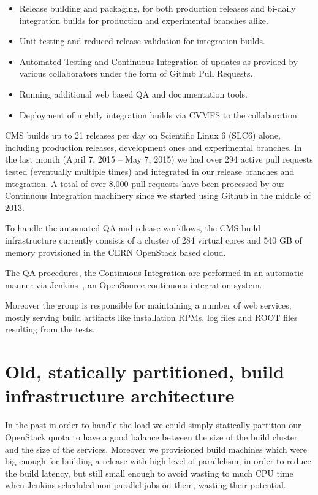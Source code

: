 \documentclass[a4paper]{jpconf}
\begin{document}
\begin{itemize}

\item Release building and packaging, for both production releases and bi-daily
integration builds for production and experimental branches alike.

\item Unit testing and reduced release validation for integration builds.

\item Automated Testing and Continuous Integration of updates as provided by
various collaborators under the form of Github Pull Requests.

\item Running additional web based QA and documentation tools.

\item Deployment of nightly integration builds via CVMFS to the collaboration.

\end{itemize}

CMS builds up to 21 releases per day on Scientific Linux 6 (SLC6) alone,
including production releases, development ones and experimental branches. In
the last month (April 7, 2015 – May 7, 2015) we had over 294 active pull
requests tested (eventually multiple times) and integrated in our release
branches and integration. A total of over 8,000 pull requests have been 
processed
by our Continuous Integration machinery since we started using Github in the
middle of 2013.~\cite{Eulisse2014}

To handle the automated QA and release workflows, the CMS build
infrastructure currently consists of a cluster of 284 virtual cores and 540 GB
of memory provisioned in the CERN OpenStack based cloud.~\cite{CERNOPENSTACK}

The QA procedures, the Continuous Integration are performed in an automatic 
manner via Jenkins~\cite{JENKINS}, an OpenSource continuous integration system.

Moreover the group is responsible for maintaining a number of web services,
mostly serving build artifacts like installation RPMs, log files and ROOT files
resulting from the tests.

\section{Old, statically partitioned, build infrastructure architecture}

In the past in order to handle the load we could simply statically partition our
OpenStack quota to have a good balance between the size of the build cluster and
the size of the services. Moreover we provisioned build machines which were big
enough for building a release with high level of parallelism, in order to reduce
the build latency, but still small enough to avoid wasting to much CPU time when
Jenkins scheduled non parallel jobs on them, wasting their potential.
\end{document}
